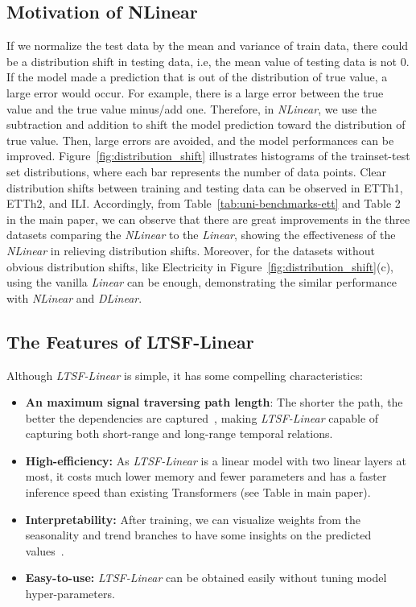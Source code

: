 \documentclass[10pt,twocolumn,letterpaper]{article}
\newcommand{\modelname}{\emph{LTSF-Linear}\xspace}
\begin{document}
\subsection{Motivation of NLinear}
If we normalize the test data by the mean and variance of train data, there could be a distribution shift in testing data, i.e, the mean value of testing data is not 0. If the model made a prediction that is out of the distribution of true value, a large error would occur. For example, there is a large error between the true value and the true value minus/add one. Therefore, in \emph{NLinear}, we use the subtraction and addition to shift the model prediction toward the distribution of true value. Then, large errors are avoided, and the model performances can be improved.
Figure~\ref{fig:distribution_shift} illustrates histograms of the trainset-test set distributions, where each bar represents the number of data points. Clear distribution shifts between training and testing data can be observed in ETTh1, ETTh2, and ILI. Accordingly, from Table~\ref{tab:uni-benchmarks-ett} and Table 2 in the main paper, we can observe that there are great improvements in the three datasets comparing the \emph{NLinear} to the \emph{Linear}, showing the effectiveness of the \emph{NLinear} in relieving distribution shifts. Moreover, for the datasets without obvious distribution shifts, like Electricity in Figure~\ref{fig:distribution_shift}(c), using the vanilla \emph{Linear} can be enough, demonstrating the similar performance with \emph{NLinear} and \emph{DLinear}.






\subsection{The Features of LTSF-Linear}


Although \modelname is simple, it has some compelling characteristics:

\begin{itemize}
\item \textbf{An  maximum signal traversing path length}: The shorter the path, the better the dependencies are captured~\cite{liu2021pyraformer}, making \modelname capable of capturing both short-range and long-range temporal relations.


\item \textbf{High-efficiency:} As \modelname is a linear model with two linear layers at most, it costs much lower memory and fewer parameters and has a faster inference speed than existing Transformers (see Table  in main paper). 



\item \textbf{Interpretability:} After training, we can visualize weights from the seasonality and trend branches to have some insights on the predicted values~\cite{dong2008granular}. 


\item \textbf{Easy-to-use:} \modelname can be obtained easily without tuning model hyper-parameters.


\end{itemize}
\end{document}
